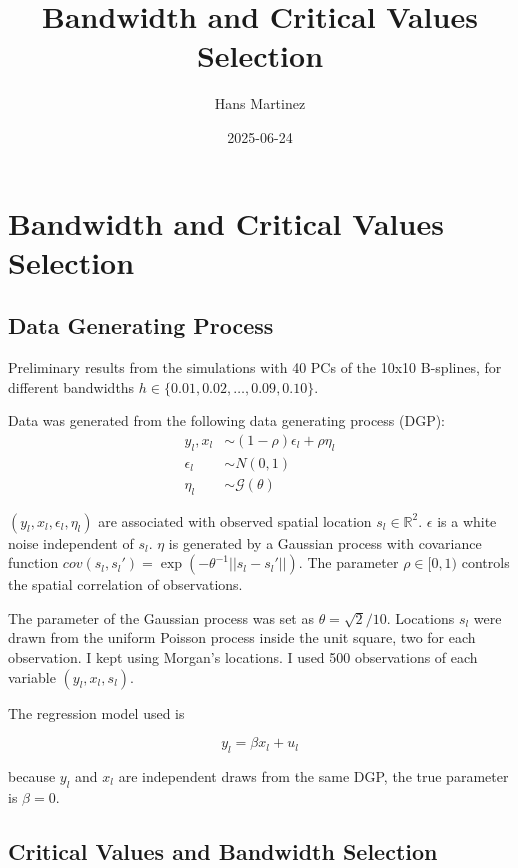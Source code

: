 \documentclass[
]{article}
\title{Bandwidth and Critical Values Selection}
\author{Hans Martinez}
\date{2025-06-24}
\begin{document}
\maketitle

\section{Bandwidth and Critical Values
Selection}\label{bandwidth-and-critical-values-selection}

\subsection{Data Generating Process}\label{data-generating-process}

Preliminary results from the simulations with 40 PCs of the 10x10
B-splines, for different bandwidths
\(h \in \{0.01, 0.02, \dots, 0.09, 0.10\}\).

Data was generated from the following data generating process (DGP): \[
\begin{aligned}
    y_l, x_l &\sim (1-\rho)\epsilon_l +\rho \eta_l \\
    \epsilon_l &\sim N(0,1) \\
    \eta_l &\sim \mathcal{G}(\theta)
\end{aligned}
\]

\((y_l,x_l,\epsilon_l,\eta_l)\) are associated with observed spatial
location \(s_l \in \mathbb{R}^2\). \(\epsilon\) is a white noise
independent of \(s_l\). \(\eta\) is generated by a Gaussian process with
covariance function
\(cov(s_l,s_{l}')=\exp(-\theta^{-1}||s_l-s_{l}'||)\). The parameter
\(\rho\in[0,1)\) controls the spatial correlation of observations.

The parameter of the Gaussian process was set as \(\theta=\sqrt{2}/10\).
Locations \(s_l\) were drawn from the uniform Poisson process inside the
unit square, two for each observation. I kept using Morgan's locations.
I used 500 observations of each variable \((y_l,x_l,s_l)\).

The regression model used is

\[
    y_l=\beta x_l + u_l 
\]

because \(y_l\) and \(x_l\) are independent draws from the same DGP, the
true parameter is \(\beta=0\).

\subsection{Critical Values and Bandwidth
Selection}\label{critical-values-and-bandwidth-selection}
\end{document}
